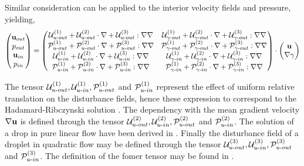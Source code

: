 Similar consideration can be applied to the interior velocity fields and pressure, yielding, 
\begin{align*}
    \begin{pmatrix}
        \textbf{u}_{out}\\
        p_{out}\\
        \textbf{u}_{in}\\
        p_{in}
    \end{pmatrix}
    =
    \begin{pmatrix}
        \mathcal{U}_{u\text -out}^{(1)} + \mathcal{U}_{u\text -out}^{(2)}\cdot \mathbf{\nabla} + \mathcal{U}_{u\text -out}^{(3)} :\mathbf{\nabla}\mathbf{\nabla} &
        \mathcal{U}_{\gamma\text -out}^{(1)} + \mathcal{U}_{\gamma\text -out}^{(2)}\cdot \mathbf{\nabla} + \mathcal{U}_{\gamma\text -out}^{(3)} :\mathbf{\nabla}\mathbf{\nabla} \\
        \mathcal{P}_{u\text -out}^{(1)} + \mathcal{P}_{u\text -out}^{(2)}\cdot \mathbf{\nabla} + \mathcal{P}_{u\text -out}^{(3)} :\mathbf{\nabla}\mathbf{\nabla} &
        \mathcal{P}_{\gamma\text -out}^{(1)} + \mathcal{P}_{\gamma\text -out}^{(2)}\cdot \mathbf{\nabla} + \mathcal{P}_{\gamma\text -out}^{(3)} :\mathbf{\nabla}\mathbf{\nabla} \\
        \mathcal{U}_{u\text-in}^{(1)} + \mathcal{U}_{u\text-in}^{(2)}\cdot \mathbf{\nabla} + \mathcal{U}_{u\text-in}^{(3)} :\mathbf{\nabla}\mathbf{\nabla} &
        \mathcal{U}_{\gamma\text-in}^{(1)} + \mathcal{U}_{\gamma\text-in}^{(2)}\cdot \mathbf{\nabla} + \mathcal{U}_{\gamma\text-in}^{(3)} :\mathbf{\nabla}\mathbf{\nabla} \\
        \mathcal{P}_{u\text-in}^{(1)} + \mathcal{P}_{u\text-in}^{(2)}\cdot \mathbf{\nabla} + \mathcal{P}_{u\text-in}^{(3)} :\mathbf{\nabla}\mathbf{\nabla} &
        \mathcal{P}_{\gamma\text-in}^{(1)} + \mathcal{P}_{\gamma\text-in}^{(2)}\cdot \mathbf{\nabla} + \mathcal{P}_{\gamma\text-in}^{(3)} :\mathbf{\nabla}\mathbf{\nabla} \\
    \end{pmatrix}
    \cdot 
    \begin{pmatrix}
        \textbf{u}\\
        \mathbf{\nabla} \gamma
    \end{pmatrix}
\end{align*}

The tensor $\mathcal{U}_{u\text -out}^{(1)},\mathcal{U}_{u\text -in}^{(1)},\mathcal{P}_{u\text -out}^{(1)}$  and $\mathcal{P}_{u\text -in}^{(1)}$ represent the effect of uniform relative translation on the disturbance fields, hence these expression to correspond to the Hadamard-Ribczynski solution \citep{pozrikidis1992boundary,kim2013microhydrodynamics}. 
The dependency with the mean gradient velocity $\mathbf{\nabla} \textbf{u}$ is defined through the tensor $\mathcal{U}_{u\text -out}^{(2)},\mathcal{U}_{u\text -in}^{(2)},\mathcal{P}_{u\text -out}^{(2)}$ and $\mathcal{P}_{u\text -in}^{(2)}$.
The solution of a drop in pure linear flow have been derived in \citet{rallison1978note,leal2007advanced,raja2010inertial}. 
Finally the disturbance field of a droplet in quadratic flow may be defined through the tensor $\mathcal{U}_{u\text -out}^{(3)},\mathcal{U}_{u\text -in}^{(3)},\mathcal{P}_{u\text -out}^{(3)}$ and $\mathcal{P}_{u\text -in}^{(3)}$.
The definition of the fomer tensor may be found in \citet{nadim1991motion}.


